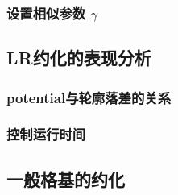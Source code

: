 \documentclass[UTF8]{ctexart}
\begin{document}
        \subsubsection{设置相似参数 $\gamma$}

    \subsection{LR约化的表现分析}

        \subsubsection{potential与轮廓落差的关系}

        \subsubsection{控制运行时间}

    \subsection{一般格基的约化}
\end{document}
